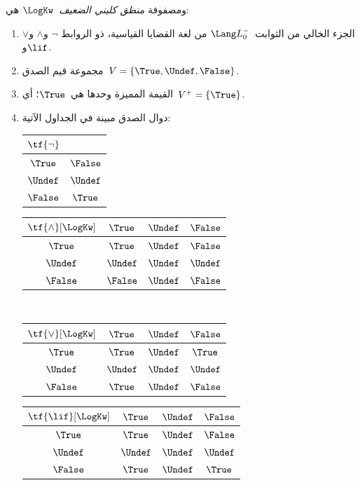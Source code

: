 \documentclass[../../../include/open-logic-section]{subfiles}
\begin{document}
\begin{defn}
ومصفوفة \emph{منطق كليني الضعيف}~$\LogKw$ هي:
\begin{enumerate}
  \item الجزء الخالي من الثوابت~$\Lang L_0^{-}$ من لغة القضايا القياسية، ذو الروابط
  $\lnot$ و$\land$ و$\lor$ و$\lif$.
  \item مجموعة قيم الصدق~$V = \{\True, \Undef, \False\}$.
  \item القيمة المميزة وحدها هي~$\True$؛ أي~$V^+ = \{\True\}$.
  \item دوال الصدق مبينة في الجداول الآتية:
  \begin{center}
    \begin{tabular}{c|c}
      $\tf{\lnot}$ & \\
      \hline
      $\True$ & $\False$ \\
      $\Undef$ & $\Undef$ \\
      $\False$ & $\True$
    \end{tabular}
    \quad
    \begin{tabular}{c|ccc}
      $\tf{\land}[\LogKw]$ & $\True$ & $\Undef$ & $\False$ \\
      \hline
      $\True$ & $\True$ & $\Undef$ & $\False$ \\
      $\Undef$ & $\Undef$ & $\Undef$ & $\Undef$\\
      $\False$ & $\False$ & $\Undef$ & $\False$
    \end{tabular}
    \\[2ex]
    \begin{tabular}{c|ccc}
      $\tf{\lor}[\LogKw]$ & $\True$ & $\Undef$ & $\False$ \\
      \hline
      $\True$ & $\True$ & $\Undef$ & $\True$ \\
      $\Undef$ & $\Undef$ & $\Undef$ & $\Undef$ \\
      $\False$ & $\True$ & $\Undef$ & $\False$
    \end{tabular}
    \quad
    \begin{tabular}{c|ccc}
      $\tf{\lif}[\LogKw]$ & $\True$ & $\Undef$ & $\False$ \\
      \hline
      $\True$ & $\True$ & $\Undef$ & $\False$ \\
      $\Undef$ & $\Undef$ & $\Undef$ & $\Undef$  \\
      $\False$ & $\True$ & $\Undef$ & $\True$
    \end{tabular}
  \end{center}
\end{enumerate}
\end{defn}
\end{document}

